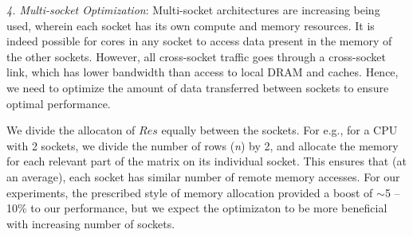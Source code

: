      

     \vspace*{0.1in}
     {\it{4. Multi-socket Optimization}}: 
     Multi-socket architectures are increasing being used,
     wherein each socket has its own
     compute and memory resources. It is indeed possible for cores in
     any socket to access data present in the memory of the other
     sockets. However, all cross-socket traffic goes through a
     cross-socket link, which has lower bandwidth than access to local
     DRAM and caches. Hence, we need to optimize the amount of data
     transferred between sockets to ensure optimal performance.

     We divide the allocaton of $Res$ equally between
     the sockets. For e.g., for a CPU with 2 sockets, we divide the
     number of rows ({\it{n}}) by 2, and allocate the memory for each
     relevant part of the matrix on its individual socket. This
     ensures that (at an average), each socket has similar number of
     remote memory accesses. For our experiments, the
     prescribed style of memory allocation provided a boost of
     $\sim$5 -- 10\% to our performance, but we expect the optimizaton
     to be more beneficial with increasing number of
     sockets.
     
     







